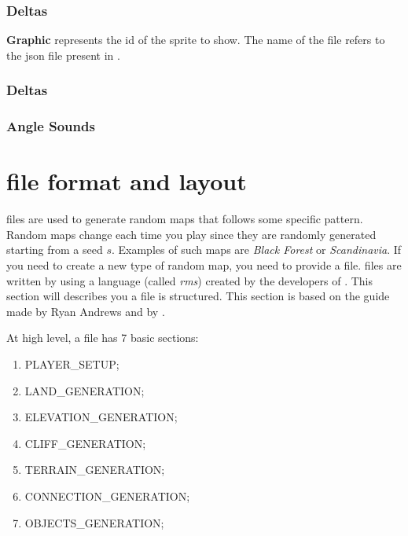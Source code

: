 \begin{appendices}
    \subsection{Deltas}

    \textbf{Graphic} represents the id of the sprite to show. The name of the file refers to the json file present in .

    \subsection{Deltas}

    \subsection{Angle Sounds}

    

    \chapter{ file format and layout}
    \label{chp:rms}

     files are used to generate random maps that follows some specific pattern. Random maps change each time you play since they are randomly generated starting from a seed $s$. Examples of such maps are \textit{Black Forest} or \textit{Scandinavia}. 
    If you need to create a new type of random map, you need to provide a  file.  files are written by using a language (called \textit{rms}) created by the developers of \aoe{}\cite{rms:2019}. This section will describes you a  file is structured. This section is based on the guide made by Ryan Andrews\cite{rms:2019} and by \cite{zetnus:2019}.

    At high level, a  file has 7 basic sections:
    
    \begin{enumerate}
        \item PLAYER\_SETUP;
        \item LAND\_GENERATION;
        \item ELEVATION\_GENERATION;
        \item CLIFF\_GENERATION;
        \item TERRAIN\_GENERATION;
        \item CONNECTION\_GENERATION;
        \item OBJECTS\_GENERATION;
    \end{enumerate}


\end{appendices}
